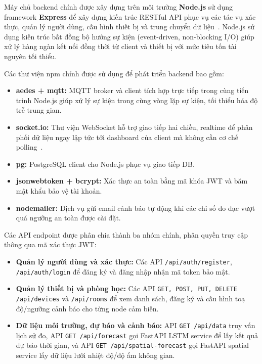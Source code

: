 Máy chủ backend chính được xây dựng trên môi trường \textbf{Node.js} sử dụng framework \textbf{Express} để xây dựng kiến trúc RESTful API phục vụ các tác vụ xác thực, quản lý người dùng, cấu hình thiết bị và trung chuyển dữ liệu~\cite{nodejs}. Node.js sử dụng kiến trúc bất đồng bộ hướng sự kiện (event-driven, non-blocking I/O) giúp xử lý hàng ngàn kết nối đồng thời từ client và thiết bị với mức tiêu tốn tài nguyên tối thiểu.

Các thư viện npm chính được sử dụng để phát triển backend bao gồm:
\begin{itemize}[leftmargin=2cm]
  \item \textbf{aedes + mqtt:} MQTT broker và client tích hợp trực tiếp trong cùng tiến trình Node.js giúp xử lý sự kiện trong cùng vòng lặp sự kiện, tối thiểu hóa độ trễ trung gian.
  \item \textbf{socket.io:} Thư viện WebSocket hỗ trợ giao tiếp hai chiều, realtime để phân phối dữ liệu ngay lập tức tới dashboard của client mà không cần cơ chế polling~\cite{socketio}.
  \item \textbf{pg:} PostgreSQL client cho Node.js phục vụ giao tiếp DB.
  \item \textbf{jsonwebtoken + bcrypt:} Xác thực an toàn bằng mã khóa JWT và băm mật khẩu bảo vệ tài khoản.
  \item \textbf{nodemailer:} Dịch vụ gửi email cảnh báo tự động khi các chỉ số đo đạc vượt quá ngưỡng an toàn được cài đặt.
\end{itemize}

Các API endpoint được phân chia thành ba nhóm chính, phân quyền truy cập thông qua mã xác thực JWT:
\begin{itemize}[leftmargin=2cm]
  \item \textbf{Quản lý người dùng và xác thực:} Các API \texttt{/api/auth/register}, \texttt{/api/auth/login} để đăng ký và đăng nhập nhận mã token bảo mật.
  \item \textbf{Quản lý thiết bị và phòng học:} Các API \texttt{GET, POST, PUT, DELETE /api/devices} và \texttt{/api/rooms} để xem danh sách, đăng ký và cấu hình toạ độ/ngưỡng cảnh báo cho từng node cảm biến.
  \item \textbf{Dữ liệu môi trường, dự báo và cảnh báo:} API \texttt{GET /api/data} truy vấn lịch sử đo, API \texttt{GET /api/forecast} gọi FastAPI LSTM service để lấy kết quả dự báo thời gian, và API \texttt{GET /api/spatial-forecast} gọi FastAPI spatial service lấy dữ liệu lưới nhiệt độ/độ ẩm không gian.
\end{itemize}


